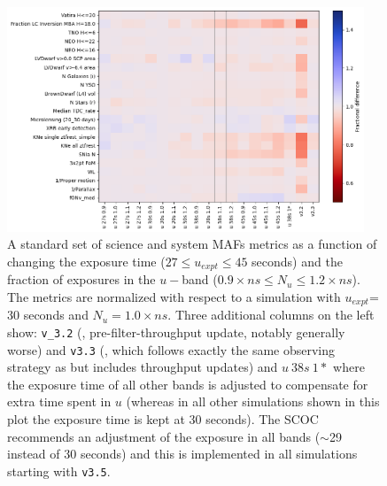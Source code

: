 \begin{figure}
\centering
   \includegraphics[width=0.95\textwidth]{figures/u_band_scoc_heatmap.png}
\caption{ A standard set of science and system MAFs metrics as a function of changing the exposure time ($27\leq u_{expt}\leq 45$ seconds) and the fraction of exposures in the $u-$band ($0.9\times ns\leq N_u \leq1.2\times ns$). The metrics are normalized with respect to a simulation with $u_{expt}$= 30 seconds and $N_u = 1.0\times ns$. Three additional columns on the left show: \texttt{v\_3.2} (, pre-filter-throughput update, notably generally worse) and \texttt{v3.3} (, which follows exactly the same observing strategy as  but includes throughput updates) and $u~38s~1*$ where the exposure time of all other bands is adjusted to compensate for extra time spent in $u$ (whereas in all other simulations shown in this plot the exposure time is kept at 30 seconds). The SCOC recommends an adjustment of the exposure in all bands (\mbox{$\sim$29} instead of 30 seconds) and this is implemented in all simulations starting with \texttt{v3.5}.}
\label{fig:uband}
\end{figure}
\FloatBarrier

